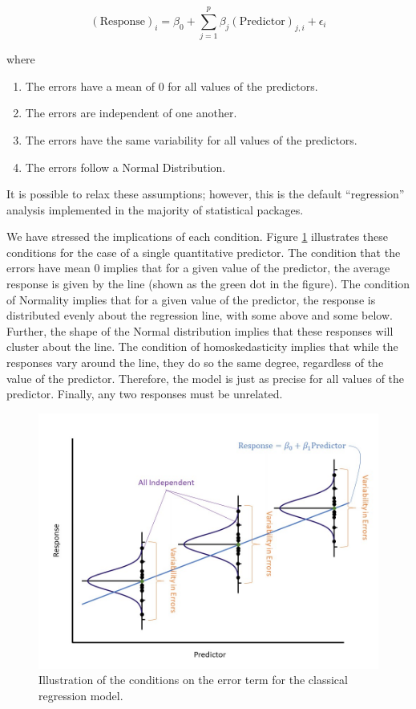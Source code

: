 \documentclass[]{book}
\providecommand{\tightlist}{%
  \setlength{\itemsep}{0pt}\setlength{\parskip}{0pt}}
\theoremstyle{definition}
\theoremstyle{definition}
\theoremstyle{definition}
\theoremstyle{remark}
\begin{document}
\[(\text{Response})_i = \beta_0 + \sum_{j=1}^{p} \beta_j (\text{Predictor})_{j,i} + \epsilon_i\]

where

\begin{enumerate}
\def\labelenumi{\arabic{enumi}.}
\tightlist
\item
  The errors have a mean of 0 for all values of the predictors.
\item
  The errors are independent of one another.
\item
  The errors have the same variability for all values of the predictors.
\item
  The errors follow a Normal Distribution.
\end{enumerate}

It is possible to relax these assumptions; however, this is the default
``regression'' analysis implemented in the majority of statistical
packages.

We have stressed the implications of each condition. Figure
\ref{fig:regconditions-assumptions} illustrates these conditions for the
case of a single quantitative predictor. The condition that the errors
have mean 0 implies that for a given value of the predictor, the average
response is given by the line (shown as the green dot in the figure).
The condition of Normality implies that for a given value of the
predictor, the response is distributed evenly about the regression line,
with some above and some below. Further, the shape of the Normal
distribution implies that these responses will cluster about the line.
The condition of homoskedasticity implies that while the responses vary
around the line, they do so the same degree, regardless of the value of
the predictor. Therefore, the model is just as precise for all values of
the predictor. Finally, any two responses must be unrelated.

\begin{figure}

{\centering \includegraphics[width=0.8\linewidth]{./images/RegConditions-Assumptions} 

}

\caption{Illustration of the conditions on the error term for the classical regression model.}\label{fig:regconditions-assumptions}
\end{figure}
\end{document}
